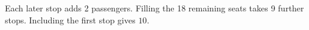 Each later stop adds 2 passengers. Filling the 18 remaining seats takes 9 further stops. Including the first stop gives $\boxed{10}$.
